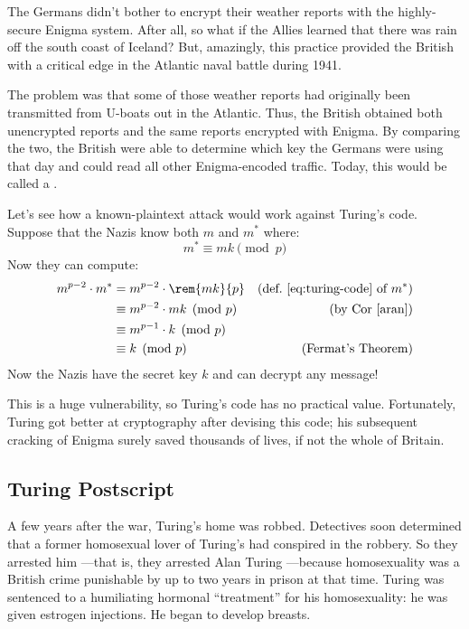 The Germans didn't bother to encrypt their weather reports with the
highly-secure Enigma system.  After all, so what if the Allies learned
that there was rain off the south coast of Iceland?  But, amazingly, this
practice provided the British with a critical edge in the Atlantic naval
battle during 1941.

The problem was that some of those weather reports had originally been
transmitted from U-boats out in the Atlantic.  Thus, the British
obtained both unencrypted reports and the same reports encrypted with
Enigma.  By comparing the two, the British were able to determine
which key the Germans were using that day and could read all other
Enigma-encoded traffic.  Today, this would be called a
.

Let's see how a known-plaintext attack would work against Turing's
code.  Suppose that the Nazis know both $m$ and $m^*$ where:
%
\[
m^* \equiv mk \pmod{p}
\]
%
Now they can compute:
%
\begin{align*}
m^{p-2} \cdot m^*
  & = m^{p-2} \cdot \rem{mk}{p}
                & \text{(def.~\eqref{eq:turing-code} of $m^*$)}\\
  & \equiv m^{p-2} \cdot mk \pmod{p} & \text{(by Cor~\ref{aran})}\\
  & \equiv m^{p-1} \cdot k \pmod{p}\\ %
  & \equiv k \pmod{p} & \text{(Fermat's Theorem)}
\end{align*}
%
Now the Nazis have the secret key $k$ and can decrypt any message!

This is a huge vulnerability, so Turing's code has no practical value.
Fortunately, Turing got better at cryptography after devising this
code; his subsequent cracking of Enigma surely saved thousands of
lives, if not the whole of Britain.


\subsection{Turing Postscript}

A few years after the war, Turing's home was robbed.  Detectives soon
determined that a former homosexual lover of Turing's had conspired in the
robbery.  So they arrested him ---that is, they arrested Alan Turing
---because homosexuality was a British crime punishable by up to two years
in prison at that time.  Turing was sentenced to a humiliating hormonal
``treatment'' for his homosexuality: he was given estrogen injections.  He
began to develop breasts.

